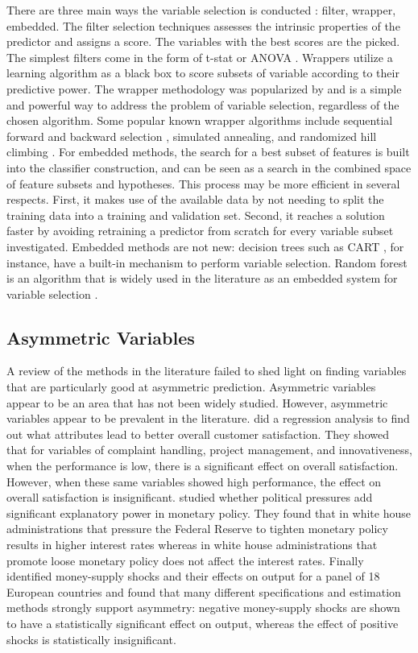 \documentclass[twoside,11pt]{article}
\begin{document}
There are three main ways the variable selection is conducted \citep{Saeys07} : filter, wrapper, embedded. The filter selection techniques assesses the intrinsic properties of the predictor and assigns a score. The variables with the best scores are the picked. The simplest filters come in the form of t-stat or ANOVA  \citep{Jafari06}. Wrappers utilize a learning algorithm as a black box to score subsets of variable according to their predictive power. The wrapper methodology was popularized by \citet{Kohavi96} and is a simple and powerful way to address the problem of variable selection, regardless of the chosen algorithm. Some popular known wrapper algorithms include sequential forward and backward selection \citep{Kittler78}, simulated annealing\citep{Kirkpatrick83}, and randomized hill climbing \citep{Skalak94}. For embedded methods, the search for a best subset of features is built into the classifier construction, and can be seen as a search in the combined space of feature subsets and hypotheses. This process may be more efficient in several respects. First, it makes use of the available data by not needing to split the training data into a training and validation set. Second, it reaches a solution faster by avoiding retraining a predictor from scratch for every variable subset investigated. Embedded methods are not new: decision trees such as CART \citep{Breiman84}, for instance, have a built-in mechanism to perform variable selection. Random forest is an algorithm that is widely used in the literature as an embedded system for variable selection \citep{Diaz06}\citep{Jiang04}.

\subsection{Asymmetric Variables}
A review of the methods in the literature failed to shed light on finding variables that are particularly good at asymmetric prediction. Asymmetric variables appear to be an area that has not been widely studied. However, asymmetric variables appear to be prevalent in the literature. \citet{Matzler04} did a regression analysis to find out what attributes lead to better overall customer satisfaction. They showed that for variables of complaint handling, project management, and innovativeness, when the performance is low, there is a significant effect on overall satisfaction. However, when these same variables showed high performance, the effect on overall satisfaction is insignificant. \citet{Froyen97} studied whether political pressures add significant explanatory power in monetary policy. They found that in white house administrations that pressure the Federal Reserve to tighten monetary policy results in higher interest rates whereas in white house administrations that promote loose monetary policy does not affect the interest rates. Finally \citet{Karras97} identified money-supply shocks and their effects on output for a panel of 18 European countries and found that many different specifications and estimation methods strongly support asymmetry: negative money-supply shocks are shown to have a statistically significant effect on output, whereas the effect of positive shocks is statistically insignificant. 
\end{document}
